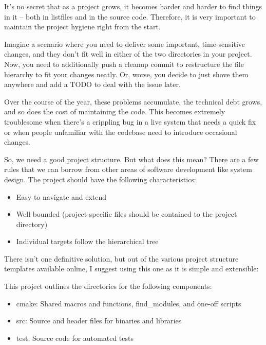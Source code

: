 

It’s no secret that as a project grows, it becomes harder and harder to find things in it – both in listfiles and in the source code. Therefore, it is very important to maintain the project hygiene right from the start.

Imagine a scenario where you need to deliver some important, time-sensitive changes, and they don’t fit well in either of the two directories in your project. Now, you need to additionally push a cleanup commit to restructure the file hierarchy to fit your changes neatly. Or, worse, you decide to just shove them anywhere and add a TODO to deal with the issue later.

Over the course of the year, these problems accumulate, the technical debt grows, and so does the cost of maintaining the code. This becomes extremely troublesome when there’s a crippling bug in a live system that needs a quick fix or when people unfamiliar with the codebase need to introduce occasional changes.

So, we need a good project structure. But what does this mean? There are a few rules that we can borrow from other areas of software development like system design. The project should have the following characteristics:

\begin{itemize}
\item
Easy to navigate and extend

\item
Well bounded (project-specific files should be contained to the project directory)

\item
Individual targets follow the hierarchical tree
\end{itemize}

There isn’t one definitive solution, but out of the various project structure templates available online, I suggest using this one as it is simple and extensible:


This project outlines the directories for the following components:

\begin{itemize}
\item
cmake: Shared macros and functions, find\_modules, and one-off scripts

\item
src: Source and header files for binaries and libraries

\item
test: Source code for automated tests
\end{itemize}

